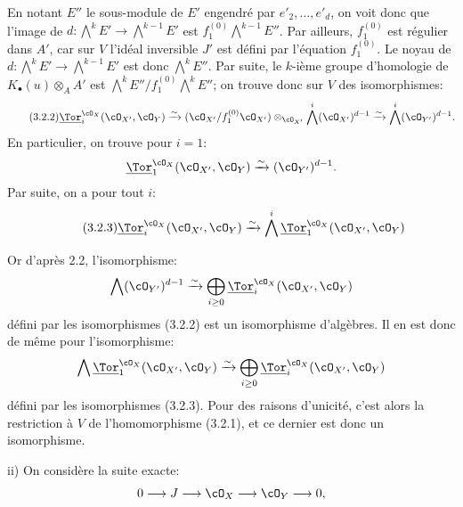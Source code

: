 En
notant \(E''\) le sous-module de \(E'\) engendré par \(e'_2,\ldots,e'_d\), on voit donc que l'image de \(d:\bigwedge^kE'\longrightarrow\bigwedge^{k-1}E'\) est \(f_1^{(0)}\bigwedge^{k-1}E''\). Par ailleurs, \(f_1^{(0)}\) est régulier dans \(A'\), car sur \(V\) l'idéal inversible \(J'\) est défini par l'équation \(f_1^{(0)}\). Le noyau de \(d:\bigwedge^kE'\longrightarrow\bigwedge^{k-1}E'\) est donc \(\bigwedge^kE''\). Par suite, le \(k\)-ième groupe d'homologie de \(K_\bullet(u)\otimes_AA'\) est \(\bigwedge^kE''/f_1^{(0)}\bigwedge^kE''\); on trouve donc sur \(V\) des isomorphismes:
\begin{equation}\tag{3.2.2}
\underline{\Tor}_i^{\cO_X}(\cO_{X'},\cO_Y)
\xrightarrow{\sim}
(\cO_{X'}/f_1^{(0)}\cO_{X'})\otimes_{\cO_{X'}}
\bigwedge^i(\cO_{X'})^{d-1}
\xrightarrow{\sim}
\bigwedge^i(\cO_{Y'})^{d-1}.
\end{equation}
En particulier, on trouve pour \(i=1\):
\[
\underline{\Tor}_1^{\cO_X}(\cO_{X'},\cO_Y)
\xrightarrow{\sim}
(\cO_{Y'})^{d-1}.
\]
Par suite, on a pour tout \(i\):
\begin{equation}\tag{3.2.3}
\underline{\Tor}_i^{\cO_X}(\cO_{X'},\cO_Y)
\xrightarrow{\sim}
\bigwedge^i\underline{\Tor}_1^{\cO_X}(\cO_{X'},\cO_Y)
\end{equation}

Or d'après 2.2, l'isomorphisme:
\[
\bigwedge(\cO_{Y'})^{d-1}
\xrightarrow{\sim}
\bigoplus_{i\ge0}\underline{\Tor}_i^{\cO_X}(\cO_{X'},\cO_Y)
\]
défini par les isomorphismes (3.2.2) est un isomorphisme d'algèbres. Il en est donc de même pour l'isomorphisme:
\[
\bigwedge\underline{\Tor}_1^{\cO_X}(\cO_{X'},\cO_Y)
\xrightarrow{\sim}
\bigoplus_{i\ge0}\underline{\Tor}_i^{\cO_X}(\cO_{X'},\cO_Y)
\]
défini par les isomorphismes (3.2.3). Pour des raisons d'unicité, c'est alors la restriction à \(V\) de l'homomorphisme (3.2.1), et ce dernier est donc un isomorphisme.

ii) On considère la suite exacte:
\[
0\longrightarrow J\longrightarrow\cO_X\longrightarrow\cO_Y\longrightarrow0,
\]
